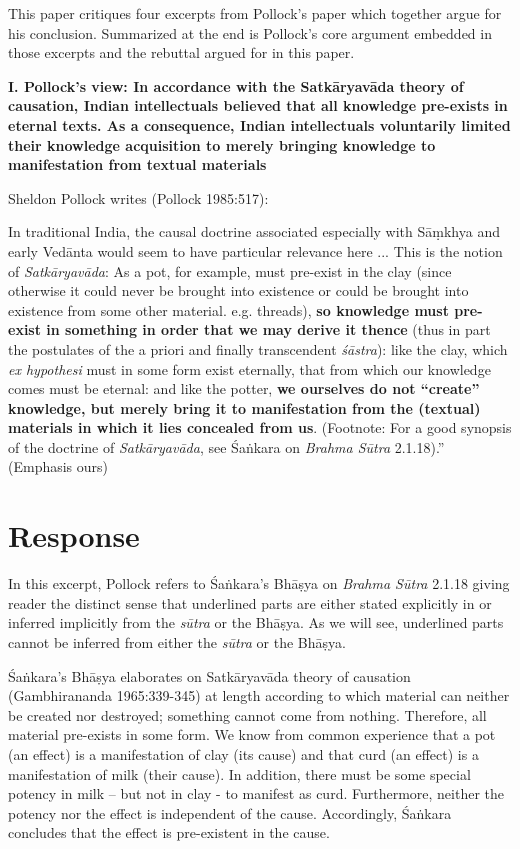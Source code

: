This paper critiques four excerpts from Pollock's paper which together argue for his conclusion. Summarized at the end is Pollock's core argument embedded in those excerpts and the rebuttal argued for in this paper.

{\bf I. Pollock's view:  In accordance with the Satkāryavāda theory of causation, Indian intellectuals believed that all knowledge pre-exists in eternal texts. As a consequence, Indian intellectuals voluntarily limited their knowledge acquisition to merely bringing knowledge to manifestation from textual materials}

Sheldon Pollock writes (Pollock 1985:517):
\begin{myquote}
In traditional India, the causal doctrine associated especially with Sāṃkhya and early Vedānta  would seem to have particular relevance here ... This is the notion of {\sl Satkāryavāda}: As a pot, for example, must pre-exist in the clay (since otherwise it could never be brought into existence or could be brought into existence from some other material. e.g.  threads), \textbf{so knowledge must pre-exist in something in order that we may derive it thence} (thus in part the postulates of the a priori and finally transcendent {\sl śāstra}): like the clay, which {\sl ex hypothesi} must in some form exist eternally, that from which our knowledge comes must be eternal: and like the potter, \textbf{we ourselves do not ``create'' knowledge, but merely bring it to manifestation from the (textual) materials in which it lies concealed from us}. (Footnote: For a good synopsis of the doctrine of {\sl Satkāryavāda}, see Śaṅkara on {\sl Brahma Sūtra} 2.1.18).'' (Emphasis ours) 
\end{myquote}

\vskip -10pt

\section*{Response}

In this excerpt, Pollock refers to Śaṅkara's Bhāṣya on {\sl Brahma Sūtra} 2.1.18 giving reader the distinct sense that underlined parts are either stated explicitly in or inferred implicitly from the {\sl sūtra} or the Bhāṣya.  As we will see, underlined parts cannot be inferred from either the {\sl sūtra} or the Bhāṣya.

Śaṅkara's Bhāṣya elaborates on Satkāryavāda theory of causation (Gambhirananda 1965:339-345) at length according to which material can neither be created nor destroyed; something cannot come from nothing. Therefore, all material pre-exists in some form.  We know from common experience that a pot (an effect) is a manifestation of clay (its cause) and that curd (an effect) is a manifestation of milk (their cause). In addition, there must be some special potency in milk -- but not in clay - to manifest as curd.  Furthermore, neither the potency nor the effect is independent of the cause.  Accordingly, Śaṅkara concludes that the effect is pre-existent in the cause.

